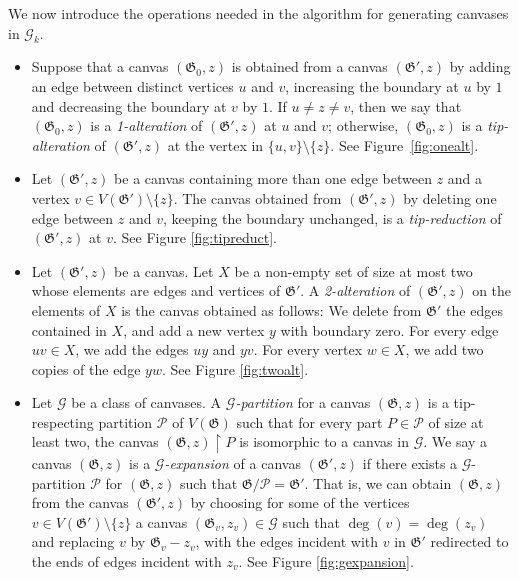 \documentclass{article}
\newcommand{\PP}{\mathcal{P}}
\newcommand{\GG}{\mathcal{G}}
\newcommand\g{\mathfrak{G}}
\begin{document}
We now introduce the operations needed in the algorithm for generating canvases in $\GG_{k}$.

\begin{itemize}
\item Suppose that a canvas $(\g_0,z)$ is obtained from a canvas $(\g',z)$ by adding an edge between distinct vertices $u$ and $v$,
increasing the boundary at $u$ by $1$ and decreasing the boundary at $v$ by $1$.
If $u\neq z\neq v$, then we say that $(\g_0,z)$ is a \emph{1-alteration} of
$(\g',z)$ at $u$ and $v$; otherwise, $(\g_0,z)$ is a \emph{tip-alteration} of
$(\g',z)$ at the vertex in $\{u,v\}\setminus\{z\}$.  %
See Figure~\ref{fig:onealt}.
\item Let $(\g',z)$ be a canvas containing more than one edge between $z$ and a vertex $v\in V(\g')\setminus\{z\}$.
The canvas obtained from $(\g',z)$ by deleting one edge between $z$ and $v$, keeping the boundary unchanged, is a \emph{tip-reduction} of $(\g',z)$ at $v$. See Figure \ref{fig:tipreduct}.
\item Let $(\g', z)$ be a canvas. Let $X$ be a non-empty set of size at most
two whose elements are edges and vertices of $\g'$. A \emph{2-alteration} of $(\g', z)$
on the elements of $X$ is the canvas obtained as follows: We delete from $\g'$
the edges contained in $X$, and add a new vertex $y$ with boundary zero. For
every edge $uv \in X$, we add the edges $uy$ and $yv$. For every vertex $w \in
X$, we add two copies of the edge $yw$. %
See Figure \ref{fig:twoalt}. 

\item Let $\GG$ be a class of canvases.  A \emph{$\GG$-partition} for a canvas $(\g,z)$ is a tip-respecting partition $\PP$ of $V(\g)$
such that for every part $P\in \PP$ of size at least two, the canvas $(\g,z)\restriction P$ is isomorphic to a canvas in $\GG$. We say a canvas $(\g,z)$ is a \emph{$\GG$-expansion} of a canvas $(\g',z)$ if
there exists a $\GG$-partition $\PP$ for $(\g,z)$ such that $\g/\PP=\g'$.  That is, we can obtain $(\g,z)$ from the canvas $(\g',z)$
by choosing for some of the vertices $v\in V(\g')\setminus\{z\}$ a canvas $(\g_v,z_v)\in \GG$ such that $\deg(v)=\deg(z_v)$
and replacing $v$ by $\g_{v}-z_{v}$, with the edges incident with $v$ in $\g'$ redirected to the ends of edges incident with $z_v$. See Figure \ref{fig:gexpansion}.
\end{itemize}
\end{document}
